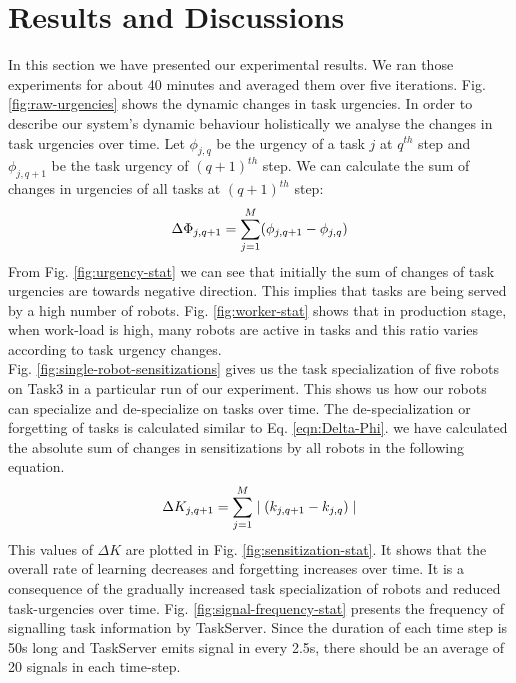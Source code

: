 \section{Results and Discussions}
\label{sec:results}
In this section we have presented our experimental results. We ran those experiments for about 40 minutes and averaged them over five iterations.
Fig. \ref{fig:raw-urgencies} shows the dynamic changes in task urgencies.  In order to describe our system's dynamic behaviour holistically we analyse the changes in task urgencies over time. Let $ \phi_{j, q}$ be the urgency of a task $j$ at $q^{th}$ step and $\phi_{j, q+1}$ be the task urgency of $(q+1)^{th}$ step. We can calculate the sum of changes in urgencies of all tasks at $(q+1)^{th}$ step:
\begin{equation} 
\small
\Delta \Phi_{j, q+1} = \sum_{j=1}^{M} (\phi_{j, q+1} - \phi_{j, q})
\label{eqn:Delta-Phi}
\end{equation}
From Fig. \ref{fig:urgency-stat} we can see that initially the sum of changes of task urgencies are towards negative direction. This implies that tasks are being served by a high number of robots. Fig. \ref{fig:worker-stat} shows that in production stage, when  work-load is high, many robots are active in tasks and this ratio varies according to task urgency changes.\\ 
Fig. \ref{fig:single-robot-sensitizations} gives us the task specialization of five robots on Task3 in a particular run of our experiment. This shows us how our robots can specialize and de-specialize on tasks over time. The de-specialization or forgetting of tasks is calculated similar to Eq. \ref{eqn:Delta-Phi}. we have calculated the absolute sum of changes in sensitizations by all robots in the following equation.
% 
\begin{equation}
\small 
\Delta K_{j, q+1} = \sum_{j=1}^{M} \mid (k_{j, q+1} - k_{j, q}) \mid
\label{eqn:Delta-K}
\end{equation}
This values of $\Delta K$ are plotted in Fig. \ref{fig:sensitization-stat}. It shows that the overall rate of learning decreases and forgetting increases over time. It is a consequence of the gradually increased task specialization of robots and reduced task-urgencies over time.
Fig. \ref{fig:signal-frequency-stat} presents the frequency of signalling task information by TaskServer. Since the duration of each time step is 50s long and TaskServer emits signal in every 2.5s, there should be an average of 20 signals in each time-step.\\
